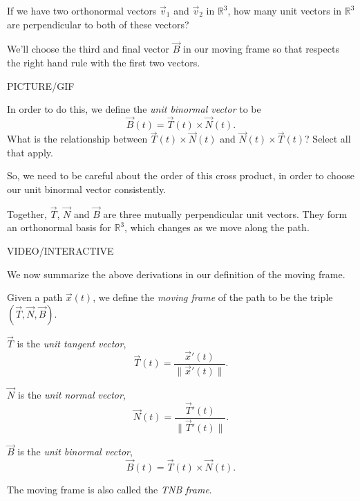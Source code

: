 \documentclass{ximera}
\begin{document}
 If we have two orthonormal vectors $\vec{v}_1$ and $\vec{v}_2$ in $\mathbb{R}^3$, how many unit vectors in $\mathbb{R}^3$ are perpendicular to both of these vectors?
 \begin{multipleChoice}
 \end{multipleChoice}
 
 We'll choose the third and final vector $\vec{B}$ in our moving frame so that respects the right hand rule with the first two vectors.
 
 PICTURE/GIF
 
In order to do this, we define the \emph{unit binormal vector} to be
\[
\vec{B}(t) = \vec{T}(t)\times\vec{N}(t).
\]
What is the relationship between $\vec{T}(t)\times\vec{N}(t)$ and $\vec{N}(t)\times\vec{T}(t)$? Select all that apply.
\begin{selectAll}
\end{selectAll}
So, we need to be careful about the order of this cross product, in order to choose our unit binormal vector consistently.

Together, $\vec{T}$, $\vec{N}$ and $\vec{B}$ are three mutually perpendicular unit vectors. They form an orthonormal basis for $\mathbb{R}^3$, which changes as we move along the path.

VIDEO/INTERACTIVE

We now summarize the above derivations in our definition of the moving frame.

\begin{definition}
Given a path $\vec{x}(t)$, we define the \emph{moving frame} of the path to be the triple $(\vec{T},\vec{N},\vec{B})$.

$\vec{T}$ is the \emph{unit tangent vector},
\[
\vec{T}(t) = \dfrac{\vec{x}'(t)}{\|\vec{x}'(t)\|}.
\]

$\vec{N}$ is the \emph{unit normal vector},
\[
\vec{N}(t) = \dfrac{\vec{T}'(t)}{\|\vec{T}'(t)\|}.
\]

$\vec{B}$ is the \emph{unit binormal vector},
\[
\vec{B}(t) = \vec{T}(t)\times\vec{N}(t).
\] 

The moving frame is also called the \emph{TNB frame}.
\end{definition}
\end{document}
